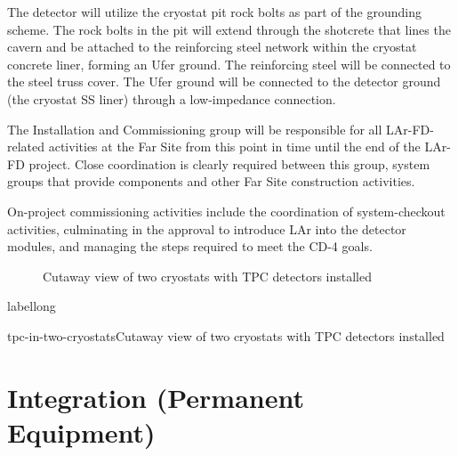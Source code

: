 The detector will utilize the cryostat pit rock bolts as part of the grounding scheme. The rock bolts in the pit will extend through the shotcrete that lines the cavern and be attached to the reinforcing steel network within the cryostat concrete liner, forming an Ufer ground. The reinforcing steel will be connected to the steel truss cover. The Ufer ground will be connected to the detector ground (the cryostat SS liner) through a low-impedance connection.

The Installation and Commissioning group will be responsible for all LAr-FD-related activities at the Far Site from this point in time until the end of the LAr-FD project. Close coordination is clearly required between this group, system groups that provide components and other Far Site construction activities. 

On-project commissioning activities include the coordination of system-checkout activities, culminating in the approval to introduce LAr into the detector modules, and managing the steps required to meet the CD-4 goals. 

\begin{figure}[htpb]
\centering
\caption{Cutaway view of two cryostats with TPC detectors installed}
\label{fig:tpc-in-two-cryostats}
\end{figure}

\begin{cdrfigure}[short]{label}{long}
\end{cdrfigure}

\begin{cdrfigure}{tpc-in-two-cryostats}{Cutaway view of two cryostats with TPC detectors installed}
\end{cdrfigure}

\section{Integration (Permanent Equipment)}
\label{fd:install:integ}

